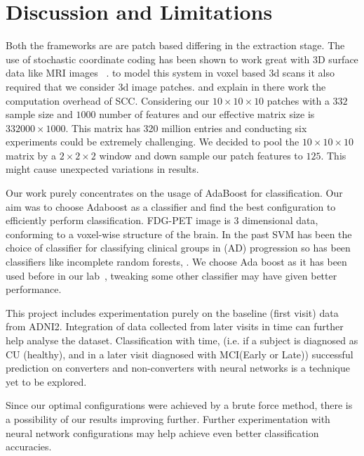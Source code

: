 \chapter{Discussion and Limitations}
Both the frameworks are are patch based differing in the extraction stage. The use of stochastic coordinate coding has been shown to work great with 3D surface data like MRI images ~\citep{zhang2016applying}. to model this system in voxel based 3d scans it also required that we consider 3d image patches. \citep*{zhang2016applying} and \citep{lin2014stochastic} explain in there work the computation overhead of SCC. Considering our $ 10\times10\times10 $ patches with a $ 332 $ sample size and $ 1000 $ number of features and our effective matrix size is $ 332000 \times 1000 $. This matrix has 320 million entries and conducting six experiments could be extremely challenging. We decided to pool the $ 10\times10\times10 $ matrix by a $ 2\times2\times2 $ window and down sample our patch features to $125$. This might cause unexpected variations in results. 

Our work purely concentrates on the usage of AdaBoost for classification. Our aim was to choose Adaboost as a classifier and find the best configuration to efficiently perform classification. FDG-PET image is 3 dimensional data, conforming to a voxel-wise structure of the brain. In the past SVM has been the choice of classifier for classifying clinical groups in (AD) progression so has been classifiers like incomplete random forests, \citep{lu2017early}. We choose Ada boost as it has been used before in our lab~\citep{zhang2016hyperbolic}, tweaking some other classifier may have given better performance.  

This project includes experimentation purely on the baseline (first visit) data from ADNI2. Integration of data collected from later visits in time can further help analyse the dataset. Classification with time, (i.e. if a subject is diagnosed as CU (healthy), and in a later visit diagnosed with MCI(Early or Late)) successful prediction on converters and non-converters with neural networks is a technique yet to be explored.

Since our optimal configurations were achieved by a brute force method, there is a possibility of our results improving further. Further experimentation with neural network configurations may help achieve even better classification accuracies.